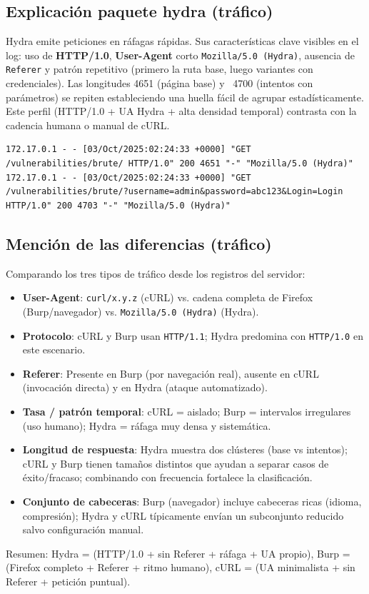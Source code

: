 \documentclass[letterpaper,12pt]{article}
\let\origsubsection\subsection
\renewcommand{\subsection}{\FloatBarrier\origsubsection}
\begin{document}
\subsection{Explicación paquete hydra (tráfico)}
Hydra emite peticiones en ráfagas rápidas. Sus características clave visibles en el log: uso de \textbf{HTTP/1.0}, \textbf{User-Agent} corto \texttt{Mozilla/5.0 (Hydra)}, ausencia de \texttt{Referer} y patrón repetitivo (primero la ruta base, luego variantes con credenciales). Las longitudes 4651 (página base) y ~4700 (intentos con parámetros) se repiten estableciendo una huella fácil de agrupar estadísticamente. Este perfil (HTTP/1.0 + UA Hydra + alta densidad temporal) contrasta con la cadencia humana o manual de cURL.
\begin{Verbatim}[breaklines=true,breakanywhere=true]
172.17.0.1 - - [03/Oct/2025:02:24:33 +0000] "GET /vulnerabilities/brute/ HTTP/1.0" 200 4651 "-" "Mozilla/5.0 (Hydra)"
172.17.0.1 - - [03/Oct/2025:02:24:33 +0000] "GET /vulnerabilities/brute/?username=admin&password=abc123&Login=Login HTTP/1.0" 200 4703 "-" "Mozilla/5.0 (Hydra)"
\end{Verbatim}

\subsection{Mención de las diferencias (tráfico)}
Comparando los tres tipos de tráfico desde los registros del servidor:
\begin{itemize}
    \item \textbf{User-Agent}: \texttt{curl/x.y.z} (cURL) vs. cadena completa de Firefox (Burp/navegador) vs. \texttt{Mozilla/5.0 (Hydra)} (Hydra).
    \item \textbf{Protocolo}: cURL y Burp usan \texttt{HTTP/1.1}; Hydra predomina con \texttt{HTTP/1.0} en este escenario.
    \item \textbf{Referer}: Presente en Burp (por navegación real), ausente en cURL (invocación directa) y en Hydra (ataque automatizado).
    \item \textbf{Tasa / patrón temporal}: cURL = aislado; Burp = intervalos irregulares (uso humano); Hydra = ráfaga muy densa y sistemática.
    \item \textbf{Longitud de respuesta}: Hydra muestra dos clústeres (base vs intentos); cURL y Burp tienen tamaños distintos que ayudan a separar casos de éxito/fracaso; combinando con frecuencia fortalece la clasificación.
    \item \textbf{Conjunto de cabeceras}: Burp (navegador) incluye cabeceras ricas (idioma, compresión); Hydra y cURL típicamente envían un subconjunto reducido salvo configuración manual.
\end{itemize}
Resumen: Hydra = (HTTP/1.0 + sin Referer + ráfaga + UA propio), Burp = (Firefox completo + Referer + ritmo humano), cURL = (UA minimalista + sin Referer + petición puntual).
\end{document}
